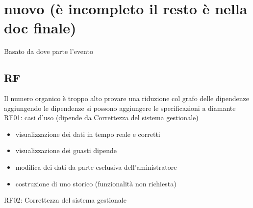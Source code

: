 \documentclass[11pt]{article}
\begin{document}
\section{nuovo (è incompleto il resto è nella doc finale)}
\label{sec:org2604714}
Basato da dove parte l'evento
\subsection{RF}
\label{sec:org7189aed}
Il numero organico è troppo alto provare una riduzione col grafo delle dipendenze
aggiungendo le dipendenze si possono aggiungere le specificazioni a diamante
RF01: casi d'uso (dipende da  Correttezza del sistema gestionale)
\begin{itemize}
\item visualizzazione dei dati in tempo reale e corretti
\item visualizzazione dei guasti dipende
\item modifica dei dati da parte esclusiva dell'aministratore
\item costruzione di uno storico (funzionalità non richiesta)
\end{itemize}
RF02: Correttezza del sistema gestionale
\end{document}

